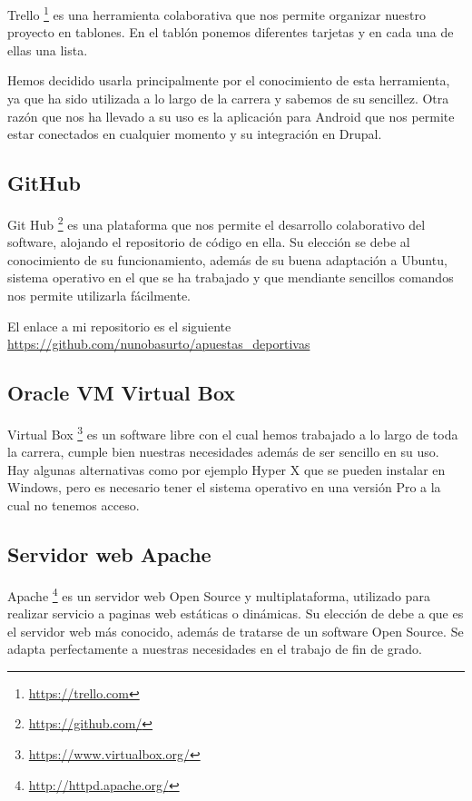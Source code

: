 Trello \footnote{\url{https://trello.com}} es una herramienta colaborativa que nos permite organizar nuestro  proyecto en tablones. En el tablón ponemos diferentes tarjetas y en cada una de ellas una lista\cite{trello}.

Hemos decidido usarla principalmente por el conocimiento de esta herramienta, ya que ha sido utilizada a lo largo de la carrera y sabemos de su sencillez. Otra razón que nos ha llevado a su uso es la aplicación para Android que nos permite estar  conectados en cualquier momento y su integración en Drupal.

\subsection{GitHub}
Git Hub \footnote{\url{https://github.com/}} es una plataforma que nos permite el desarrollo colaborativo del software, alojando el repositorio de código en ella.
Su elección se debe al conocimiento de su funcionamiento, además de su buena adaptación a Ubuntu, sistema operativo en el que se ha trabajado y que mendiante sencillos comandos nos permite utilizarla fácilmente. 

El enlace a mi repositorio es el siguiente \url{https://github.com/nunobasurto/apuestas_deportivas}

\subsection{Oracle VM Virtual Box}
Virtual Box \footnote{\url{https://www.virtualbox.org/}} es un software libre con el cual hemos trabajado a lo largo de toda la carrera, cumple bien nuestras necesidades además de ser sencillo en su uso. Hay algunas alternativas como por ejemplo Hyper X que se pueden instalar en Windows, pero es necesario tener el sistema operativo en una versión Pro a la cual no tenemos acceso.

\subsection{Servidor web Apache}
Apache \footnote{\url{http://httpd.apache.org/}} es un servidor web Open Source y multiplataforma, utilizado para realizar servicio a paginas web estáticas o dinámicas.
Su elección de debe a que es el servidor web más conocido, además de tratarse de un software Open Source. Se adapta perfectamente a nuestras necesidades en el trabajo de fin de grado\cite{wiki:apache}.


